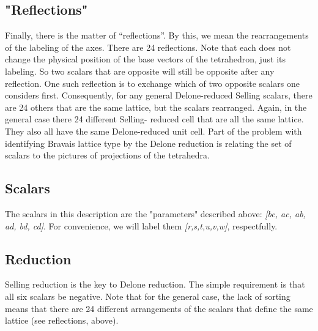 \documentclass[11pt]{article} %
\begin{document}
\subsection{"Reflections"}
Finally, there is the matter of ``reflections''. By this, we mean the rearrangements of the labeling of the axes. There are 24 reflections. Note that each does not change the physical position of the base vectors of the tetrahedron, just its labeling. So two scalars that are opposite will still be opposite after any reflection. One such reflection is to exchange which of two opposite scalars one considers first. Consequently, for any general Delone-reduced Selling scalars, there are 24 others that are the same lattice, but the scalars rearranged. Again, in the general case there 24 different Selling- reduced cell that are all the same lattice. They also all have the same Delone-reduced unit cell. Part of the problem with identifying Bravais lattice type by the Delone reduction is relating the set of scalars to the pictures of projections of the tetrahedra.

\subsection{Scalars}

The scalars in this description are the "parameters" described above: \textit{[b{\textbullet}c, a{\textbullet}c, a{\textbullet}b, a{\textbullet}d, b{\textbullet}d, c{\textbullet}d]}. For convenience, we will label them \textit{[r,s,t,u,v,w]}, respectfully.

\subsection{Reduction}

Selling reduction is the key to Delone reduction. The simple requirement is that all six scalars be negative. Note that for the general case, the lack of sorting means that there are 24 different arrangements of the scalars that define the same lattice (see reflections, above).



\end{document}
